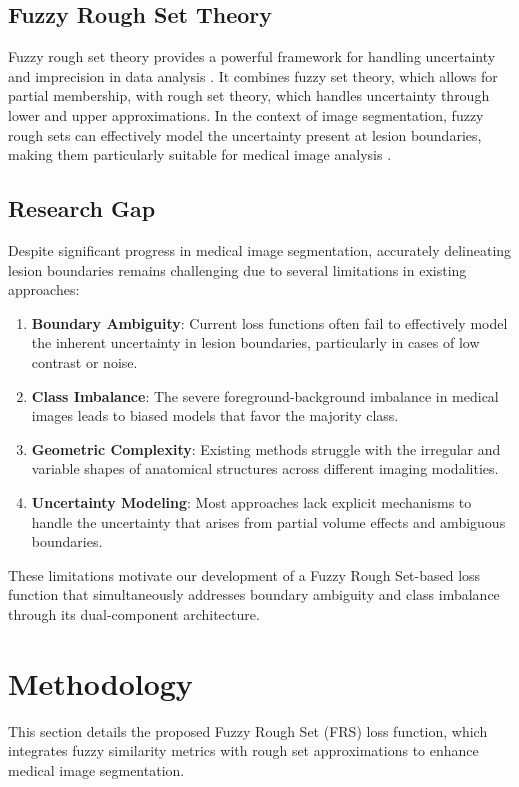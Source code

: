 \documentclass[review]{elsarticle}
\begin{document}
\subsection{Fuzzy Rough Set Theory}
Fuzzy rough set theory provides a powerful framework for handling uncertainty and imprecision in data analysis \cite{Cock2007}. It combines fuzzy set theory, which allows for partial membership, with rough set theory, which handles uncertainty through lower and upper approximations. In the context of image segmentation, fuzzy rough sets can effectively model the uncertainty present at lesion boundaries, making them particularly suitable for medical image analysis \cite{Hong2019, AFFONSO2015}.

\subsection{Research Gap}
Despite significant progress in medical image segmentation, accurately delineating lesion boundaries remains challenging due to several limitations in existing approaches:

\begin{enumerate}
	\item \textbf{Boundary Ambiguity}: Current loss functions often fail to effectively model the inherent uncertainty in lesion boundaries, particularly in cases of low contrast or noise.
	
	\item \textbf{Class Imbalance}: The severe foreground-background imbalance in medical images leads to biased models that favor the majority class.
	
	\item \textbf{Geometric Complexity}: Existing methods struggle with the irregular and variable shapes of anatomical structures across different imaging modalities.
	
	\item \textbf{Uncertainty Modeling}: Most approaches lack explicit mechanisms to handle the uncertainty that arises from partial volume effects and ambiguous boundaries.
\end{enumerate}

These limitations motivate our development of a Fuzzy Rough Set-based loss function that simultaneously addresses boundary ambiguity and class imbalance through its dual-component architecture.


\section{Methodology}\label{methods}
This section details the proposed Fuzzy Rough Set (FRS) loss function, which integrates fuzzy similarity metrics with rough set approximations to enhance medical image segmentation.
\end{document}
